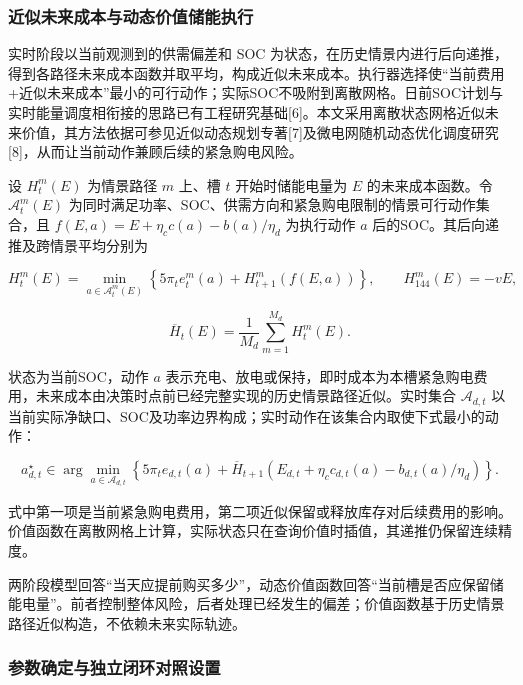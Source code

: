\documentclass[zihao=-4,a4paper,UTF8,fontset=none]{ctexart}
\begin{document}
\subsubsection{近似未来成本与动态价值储能执行}\label{ux8fd1ux4f3cux672aux6765ux6210ux672cux4e0eux52a8ux6001ux4ef7ux503cux50a8ux80fdux6267ux884c}

实时阶段以当前观测到的供需偏差和 SOC 为状态，在历史情景内进行后向递推，得到各路径未来成本函数并取平均，构成近似未来成本。执行器选择使``当前费用+近似未来成本''最小的可行动作；实际SOC不吸附到离散网格。日前SOC计划与实时能量调度相衔接的思路已有工程研究基础{[}6{]}。本文采用离散状态网格近似未来价值，其方法依据可参见近似动态规划专著{[}7{]}及微电网随机动态优化调度研究{[}8{]}，从而让当前动作兼顾后续的紧急购电风险。

设 \(H_t^m(E)\) 为情景路径 \(m\) 上、槽 \(t\) 开始时储能电量为 \(E\) 的未来成本函数。令 \(\mathcal A_t^m(E)\) 为同时满足功率、SOC、供需方向和紧急购电限制的情景可行动作集合，且 \(f(E,a)=E+\eta_c c(a)-b(a)/\eta_d\) 为执行动作 \(a\) 后的SOC。其后向递推及跨情景平均分别为

\[
H_t^m(E)=\min_{a\in\mathcal A_t^m(E)}\left\{5\pi_t e_t^m(a)+H_{t+1}^m\!\left(f(E,a)\right)\right\},
\qquad H_{144}^m(E)=-vE,
\tag{7a}
\]

\[
\overline H_t(E)=\frac{1}{M_d}\sum_{m=1}^{M_d}H_t^m(E).
\tag{7b}
\]

状态为当前SOC，动作 \(a\) 表示充电、放电或保持，即时成本为本槽紧急购电费用，未来成本由决策时点前已经完整实现的历史情景路径近似。实时集合 \(\mathcal A_{d,t}\) 以当前实际净缺口、SOC及功率边界构成；实时动作在该集合内取使下式最小的动作：

\[
a_{d,t}^{\star}\in\arg\min_{a\in\mathcal A_{d,t}}\left\{
5\pi_t e_{d,t}(a)+\overline H_{t+1}\!\left(E_{d,t}+\eta_c c_{d,t}(a)-b_{d,t}(a)/\eta_d\right)
\right\}.
\tag{7c}
\]

式中第一项是当前紧急购电费用，第二项近似保留或释放库存对后续费用的影响。价值函数在离散网格上计算，实际状态只在查询价值时插值，其递推仍保留连续精度。

两阶段模型回答``当天应提前购买多少''，动态价值函数回答``当前槽是否应保留储能电量''。前者控制整体风险，后者处理已经发生的偏差；价值函数基于历史情景路径近似构造，不依赖未来实际轨迹。

\subsubsection{参数确定与独立闭环对照设置}\label{ux53c2ux6570ux786eux5b9aux4e0eux72ecux7acbux95edux73afux5bf9ux7167ux8bbeux7f6e}
\end{document}
